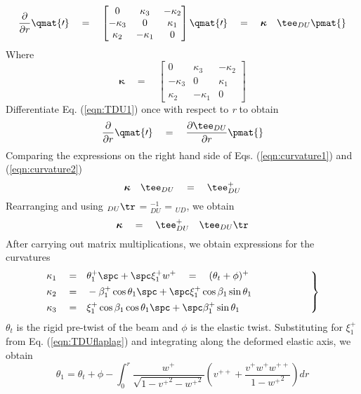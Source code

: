 \begin{equation}
\label{eqn:curvature1}
\frac{\partial}{\partial r} \qmat{\prime} \quad = \quad 
\begin{bmatrix}
0 & \kappa_3 & -\kappa_2 \\
-\kappa_3 & 0 & \kappa_1 \\
\kappa_2 & -\kappa_1 & 0 \end{bmatrix} \qmat{\prime} 
\quad = \quad \boldsymbol\kappa  \quad \tee_{DU} \pmat{ }
\end{equation}
Where 
\begin{equation}
\label{eqn:curvaturedef}
\boldsymbol\kappa  \quad = \quad \begin{bmatrix}
0 & \kappa_3 & -\kappa_2 \\
-\kappa_3 & 0 & \kappa_1 \\
\kappa_2 & -\kappa_1 & 0 \end{bmatrix}
\end{equation}
Differentiate Eq. (\ref{eqn:TDU1}) once with respect to \emph{r} to obtain
\begin{equation}
\label{eqn:curvature2}
\frac{\partial}{\partial r} \qmat{\prime} \quad = \quad \frac{\partial \tee_{DU}}{\partial r} \pmat{}
\end{equation}
Comparing the expressions on the right hand side of Eqs. (\ref{eqn:curvature1}) and (\ref{eqn:curvature2})
\[\boldsymbol\kappa \quad  \tee_{DU} \quad = \quad \tee_{DU}^{+}\]
Rearranging and using \tee$_{DU}\tr$ \quad = \quad \tee$_{DU}^{-1}$ \quad = \quad \tee$_{UD}$, we obtain
\begin{equation}
\label{eqn:curvature3}
\boldsymbol\kappa \quad = \quad \tee_{DU}^+ \quad \tee_{DU}\tr 
\end{equation} 
After carrying out matrix multiplications, we obtain expressions for the curvatures 
\begin{equation}
\label{eqn:curvatures}
\left.
\begin{aligned}
\kappa_1 \quad = \quad & \theta_1^+ \spc  + \spc  \xi_1^+ w^+  \quad = \quad (\theta_t + \phi)^+ \qquad \qquad \qquad \\
\kappa_2 \quad = \quad & -\beta_1^+ \cos \theta_1 \spc  + \spc  \xi_1^+ \cos \beta_1 \sin \theta_1 \qquad \qquad \qquad \\
\kappa_3 \quad = \quad &\xi_1^+ \cos\beta_1 \cos \theta_1 \spc  + \spc  \beta_1^+ \sin \theta_1 \qquad \qquad \qquad 
\end{aligned}
\right\}
\end{equation}
$\theta_t$ is the rigid pre-twist of the beam and $\phi$ is the elastic twist. Substituting for $\xi_1^+$ from Eq. (\ref{eqn:TDUflaplag}) and integrating along the deformed elastic axis, we obtain 
\begin{equation}
\label{eqn:3rdanglepitch}
\theta_1 = \theta_t + \phi - \int_{0}^{r} \frac{w^+}{\sqrt{1 - {v^+}^2 - {w^+}^2}} \left(v^{++} + \frac{v^+ w^+ w^{++}}{1 - {w^+}^2}\right) dr
\end{equation}

